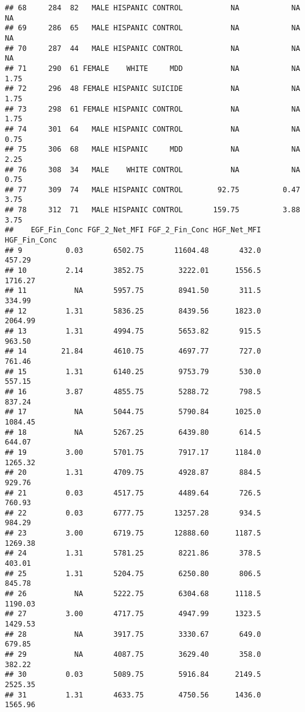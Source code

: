 \documentclass[]{article}
\begin{document}
\begin{verbatim}
## 68     284  82   MALE HISPANIC CONTROL           NA            NA          NA
## 69     286  65   MALE HISPANIC CONTROL           NA            NA          NA
## 70     287  44   MALE HISPANIC CONTROL           NA            NA          NA
## 71     290  61 FEMALE    WHITE     MDD           NA            NA        1.75
## 72     296  48 FEMALE HISPANIC SUICIDE           NA            NA        1.75
## 73     298  61 FEMALE HISPANIC CONTROL           NA            NA        1.75
## 74     301  64   MALE HISPANIC CONTROL           NA            NA        0.75
## 75     306  68   MALE HISPANIC     MDD           NA            NA        2.25
## 76     308  34   MALE    WHITE CONTROL           NA            NA        0.75
## 77     309  74   MALE HISPANIC CONTROL        92.75          0.47        3.75
## 78     312  71   MALE HISPANIC CONTROL       159.75          3.88        3.75
##    EGF_Fin_Conc FGF_2_Net_MFI FGF_2_Fin_Conc HGF_Net_MFI HGF_Fin_Conc
## 9          0.03       6502.75       11604.48       432.0       457.29
## 10         2.14       3852.75        3222.01      1556.5      1716.27
## 11           NA       5957.75        8941.50       311.5       334.99
## 12         1.31       5836.25        8439.56      1823.0      2064.99
## 13         1.31       4994.75        5653.82       915.5       963.50
## 14        21.84       4610.75        4697.77       727.0       761.46
## 15         1.31       6140.25        9753.79       530.0       557.15
## 16         3.87       4855.75        5288.72       798.5       837.24
## 17           NA       5044.75        5790.84      1025.0      1084.45
## 18           NA       5267.25        6439.80       614.5       644.07
## 19         3.00       5701.75        7917.17      1184.0      1265.32
## 20         1.31       4709.75        4928.87       884.5       929.76
## 21         0.03       4517.75        4489.64       726.5       760.93
## 22         0.03       6777.75       13257.28       934.5       984.29
## 23         3.00       6719.75       12888.60      1187.5      1269.38
## 24         1.31       5781.25        8221.86       378.5       403.01
## 25         1.31       5204.75        6250.80       806.5       845.78
## 26           NA       5222.75        6304.68      1118.5      1190.03
## 27         3.00       4717.75        4947.99      1323.5      1429.53
## 28           NA       3917.75        3330.67       649.0       679.85
## 29           NA       4087.75        3629.40       358.0       382.22
## 30         0.03       5089.75        5916.84      2149.5      2525.35
## 31         1.31       4633.75        4750.56      1436.0      1565.96

\end{verbatim}
\end{document}
